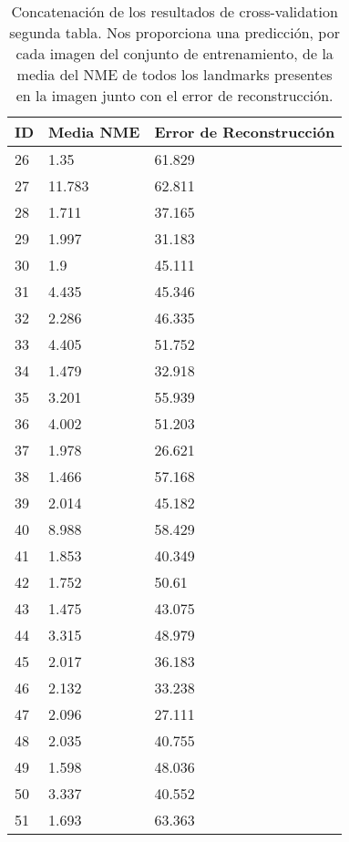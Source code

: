 \begin{table}[!ht]
    \centering
    \caption{Concatenación de los resultados de cross-validation segunda tabla. Nos proporciona una predicción, por cada imagen del conjunto de entrenamiento, de la media del NME de todos los landmarks presentes en la imagen junto con el error de reconstrucción.}
    \begin{tabular}{|l|l|l|}
    \hline
        \cellcolor{gray!25}\textbf{ID} & \cellcolor{gray!25}\textbf{Media NME} & \cellcolor{gray!25}\textbf{Error de Reconstrucción} \\ \hline
        26 & 1.35 & 61.829 \\ \hline
        27 & 11.783 & 62.811 \\ \hline
        28 & 1.711 & 37.165 \\ \hline
        29 & 1.997 & 31.183 \\ \hline
        30 & 1.9 & 45.111 \\ \hline
        31 & 4.435 & 45.346 \\ \hline
        32 & 2.286 & 46.335 \\ \hline
        33 & 4.405 & 51.752 \\ \hline
        34 & 1.479 & 32.918 \\ \hline
        35 & 3.201 & 55.939 \\ \hline
        36 & 4.002 & 51.203 \\ \hline
        37 & 1.978 & 26.621 \\ \hline
        38 & 1.466 & 57.168 \\ \hline
        39 & 2.014 & 45.182 \\ \hline
        40 & 8.988 & 58.429 \\ \hline
        41 & 1.853 & 40.349 \\ \hline
        42 & 1.752 & 50.61 \\ \hline
        43 & 1.475 & 43.075 \\ \hline
        44 & 3.315 & 48.979 \\ \hline
        45 & 2.017 & 36.183 \\ \hline
        46 & 2.132 & 33.238 \\ \hline
        47 & 2.096 & 27.111 \\ \hline
        48 & 2.035 & 40.755 \\ \hline
        49 & 1.598 & 48.036 \\ \hline
        50 & 3.337 & 40.552 \\ \hline
        51 & 1.693 & 63.363 \\ \hline
    \end{tabular}
    \label{table:ModelBase_landmarkresume}
\end{table}



